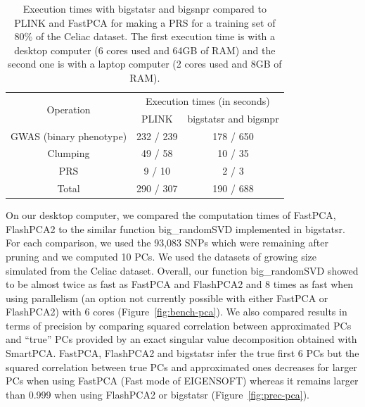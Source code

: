 \documentclass{bioinfo}
\begin{document}
\begin{table}[!tpb]
\begin{center}
\begin{adjustbox}{max width=235pt}
\begin{tabular}{|c|c|c|}
\hline
\multirow{2}{*}{Operation} &   \multicolumn{2}{c|}{Execution times (in seconds)} \\
 \cline{2-3}
 & PLINK & bigstatsr and bigsnpr \\
\hline
GWAS (binary phenotype) & 232 / 239 & 178 / 650  \\
Clumping & 49 / 58 & 10 / 35 \\
PRS & 9 / 10 & 2 / 3 \\
\hline
Total & 290 / 307 & 190 / 688 \\
\hline
\end{tabular} 
\end{adjustbox}
\end{center}
\caption{Execution times with bigstatsr and bigsnpr compared to PLINK and FastPCA for making a PRS for a training set of 80\% of the Celiac dataset. The first execution time is with a desktop computer (6 cores used and 64GB of RAM) and the second one is with a laptop computer (2 cores used and 8GB of RAM).}
\label{tab:bench-prs}
\end{table}

On our desktop computer, we compared the computation times of FastPCA, FlashPCA2 to the similar function big\_randomSVD implemented in bigstatsr. For each comparison, we used the 93,083 SNPs which were remaining after pruning and we computed 10 PCs. We used the datasets of growing size simulated from the Celiac dataset. Overall, our function big\_randomSVD showed to be almost twice as fast as FastPCA and FlashPCA2 and 8 times as fast when using parallelism (an option not currently possible with either FastPCA or FlashPCA2) with 6 cores (Figure~\ref{fig:bench-pca}). We also compared results in terms of precision by comparing squared correlation between approximated PCs and ``true'' PCs provided by an exact singular value decomposition obtained with SmartPCA. FastPCA, FlashPCA2 and bigstatsr infer the true first 6 PCs but the squared correlation between true PCs and approximated ones decreases for larger PCs when using FastPCA (Fast mode of EIGENSOFT) whereas it remains larger than 0.999 when using FlashPCA2 or bigstatsr (Figure~\ref{fig:prec-pca}).   
\end{document}
